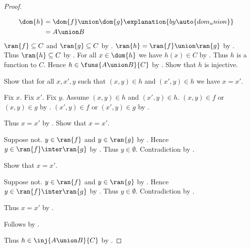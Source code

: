 \begin{proof}
\begin{subproof}
    \end{subproof}
    \begin{align*}
        \dom{h}
            &= \dom{f}\union\dom{g}
                \explanation{by \auto{dom_union}}
            \\
            &= A\union B
    \end{align*}
    $\ran{f}\subseteq C$ and $\ran{g}\subseteq C$ by .
    $\ran{h}=\ran{f}\union\ran{g}$ by .
    Thus $\ran{h}\subseteq C$ by .
    For all $x\in\dom{h}$ we have $h(x)\in C$
        by .
    Thus $h$ is a function to $C$.
    Hence $h\in\funs{A\union B}{C}$ by .
    Show that $h$ is injective.
    \begin{subproof}
        Show that for all $x,x',y$ such that
            $(x,y)\in h$ and $(x',y)\in h$ we have $x=x'$.
        \begin{subproof}
            Fix $x$.
            Fix $x'$.
            Fix $y$.
            Assume $(x,y)\in h$ and $(x',y)\in h$.
            $(x,y)\in f$ or $(x,y)\in g$ by .
            $(x',y)\in f$ or $(x',y)\in g$ by .
            \begin{byCase}
                Thus $x=x'$ by .
                Show that $x=x'$.
                \begin{subproof}
                    Suppose not.
                    $y\in\ran{f}$ and $y\in\ran{g}$ by .
                    Hence $y\in\ran{f}\inter\ran{g}$ by .
                    Thus $y\in\emptyset$.
                    Contradiction by .
                \end{subproof}
                Show that $x=x'$.
                \begin{subproof}
                    Suppose not.
                    $y\in\ran{f}$ and $y\in\ran{g}$ by .
                    Hence $y\in\ran{f}\inter\ran{g}$ by .
                    Thus $y\in\emptyset$.
                    Contradiction by .
                \end{subproof}
                Thus $x=x'$ by .
            \end{byCase}
        \end{subproof}
        Follows by .
    \end{subproof}
    Thus $h\in\inj{A\union B}{C}$
        by .
\end{proof}

